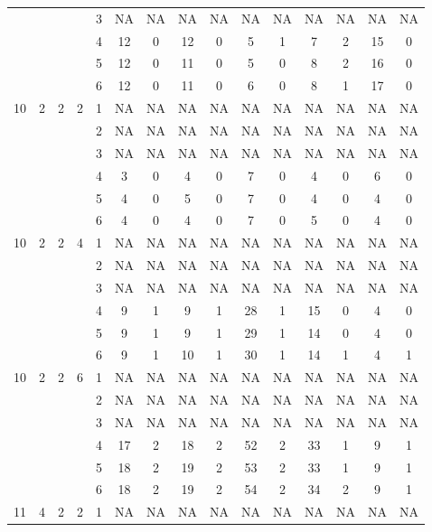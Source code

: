 \begin{longtable}{|c|c|c|c|c|c c|c c|c c|c c|c c|}
 & & & & 3 & NA & NA & NA & NA & NA & NA & NA & NA & NA & NA \\
 & & & & 4 & 12 & 0 & 12 & 0 & 5 & 1 & 7 & 2 & 15 & 0 \\
 & & & & 5 & 12 & 0 & 11 & 0 & 5 & 0 & 8 & 2 & 16 & 0 \\
 & & & & 6 & 12 & 0 & 11 & 0 & 6 & 0 & 8 & 1 & 17 & 0 \\
\hline
\multirow{6}{*}{10} & \multirow{6}{*}{2} & \multirow{6}{*}{2} & \multirow{6}{*}{2} & 1 & NA & NA & NA & NA & NA & NA & NA & NA & NA & NA \\
 & & & & 2 & NA & NA & NA & NA & NA & NA & NA & NA & NA & NA \\
 & & & & 3 & NA & NA & NA & NA & NA & NA & NA & NA & NA & NA \\
 & & & & 4 & 3 & 0 & 4 & 0 & 7 & 0 & 4 & 0 & 6 & 0 \\
 & & & & 5 & 4 & 0 & 5 & 0 & 7 & 0 & 4 & 0 & 4 & 0 \\
 & & & & 6 & 4 & 0 & 4 & 0 & 7 & 0 & 5 & 0 & 4 & 0 \\
\hline
\multirow{6}{*}{10} & \multirow{6}{*}{2} & \multirow{6}{*}{2} & \multirow{6}{*}{4} & 1 & NA & NA & NA & NA & NA & NA & NA & NA & NA & NA \\
 & & & & 2 & NA & NA & NA & NA & NA & NA & NA & NA & NA & NA \\
 & & & & 3 & NA & NA & NA & NA & NA & NA & NA & NA & NA & NA \\
 & & & & 4 & 9 & 1 & 9 & 1 & 28 & 1 & 15 & 0 & 4 & 0 \\
 & & & & 5 & 9 & 1 & 9 & 1 & 29 & 1 & 14 & 0 & 4 & 0 \\
 & & & & 6 & 9 & 1 & 10 & 1 & 30 & 1 & 14 & 1 & 4 & 1 \\
\hline
\multirow{6}{*}{10} & \multirow{6}{*}{2} & \multirow{6}{*}{2} & \multirow{6}{*}{6} & 1 & NA & NA & NA & NA & NA & NA & NA & NA & NA & NA \\
 & & & & 2 & NA & NA & NA & NA & NA & NA & NA & NA & NA & NA \\
 & & & & 3 & NA & NA & NA & NA & NA & NA & NA & NA & NA & NA \\
 & & & & 4 & 17 & 2 & 18 & 2 & 52 & 2 & 33 & 1 & 9 & 1 \\
 & & & & 5 & 18 & 2 & 19 & 2 & 53 & 2 & 33 & 1 & 9 & 1 \\
 & & & & 6 & 18 & 2 & 19 & 2 & 54 & 2 & 34 & 2 & 9 & 1 \\
\hline
\multirow{6}{*}{11} & \multirow{6}{*}{4} & \multirow{6}{*}{2} & \multirow{6}{*}{2} & 1 & NA & NA & NA & NA & NA & NA & NA & NA & NA & NA \\

\end{longtable}
